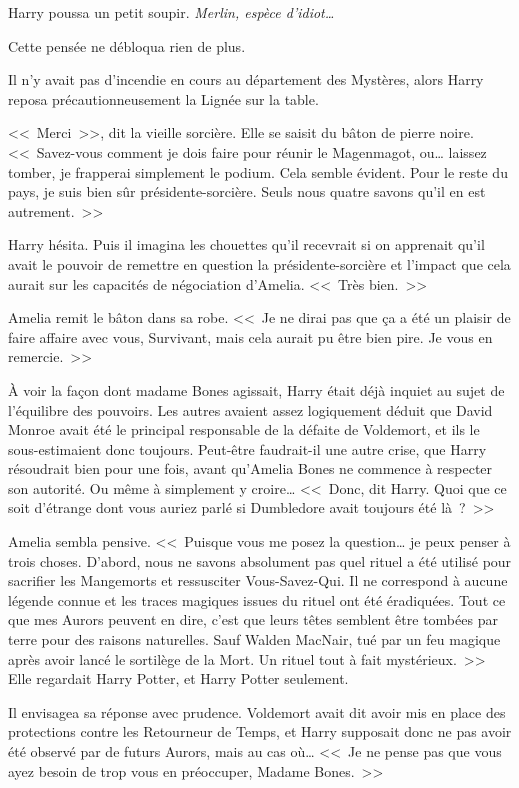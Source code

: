 Harry poussa un petit soupir. \emph{Merlin, espèce d'idiot…}

Cette pensée ne débloqua rien de plus.

Il n'y avait pas d'incendie en cours au département des Mystères, alors Harry reposa précautionneusement la Lignée sur la table.

<<~Merci~>>, dit la vieille sorcière. Elle se saisit du bâton de pierre noire. <<~Savez-vous comment je dois faire pour réunir le Magenmagot, ou… laissez tomber, je frapperai simplement le podium. Cela semble évident. Pour le reste du pays, je suis bien sûr présidente-sorcière. Seuls nous quatre savons qu'il en est autrement.~>>

Harry hésita. Puis il imagina les chouettes qu'il recevrait si on apprenait qu'il avait le pouvoir de remettre en question la présidente-sorcière et l'impact que cela aurait sur les capacités de négociation d'Amelia. <<~Très bien.~>>

Amelia remit le bâton dans sa robe. <<~Je ne dirai pas que ça a été un plaisir de faire affaire avec vous, Survivant, mais cela aurait pu être bien pire. Je vous en remercie.~>>

À voir la façon dont madame Bones agissait, Harry était déjà inquiet au sujet de l'équilibre des pouvoirs. Les autres avaient assez logiquement déduit que David Monroe avait été le principal responsable de la défaite de Voldemort, et ils le sous-estimaient donc toujours. Peut-être faudrait-il une autre crise, que Harry résoudrait bien pour une fois, avant qu'Amelia Bones ne commence à respecter son autorité. Ou même à simplement y croire… <<~Donc, dit Harry. Quoi que ce soit d'étrange dont vous auriez parlé si Dumbledore avait toujours été là~?~>>

Amelia sembla pensive. <<~Puisque vous me posez la question… je peux penser à trois choses. D'abord, nous ne savons absolument pas quel rituel a été utilisé pour sacrifier les Mangemorts et ressusciter Vous-Savez-Qui. Il ne correspond à aucune légende connue et les traces magiques issues du rituel ont été éradiquées. Tout ce que mes Aurors peuvent en dire, c'est que leurs têtes semblent être tombées par terre pour des raisons naturelles. Sauf Walden MacNair, tué par un feu magique après avoir lancé le sortilège de la Mort. Un rituel tout à fait mystérieux.~>> Elle regardait Harry Potter, et Harry Potter seulement.

Il envisagea sa réponse avec prudence. Voldemort avait dit avoir mis en place des protections contre les Retourneur de Temps, et Harry supposait donc ne pas avoir été observé par de futurs Aurors, mais au cas où… <<~Je ne pense pas que vous ayez besoin de trop vous en préoccuper, Madame Bones.~>>

